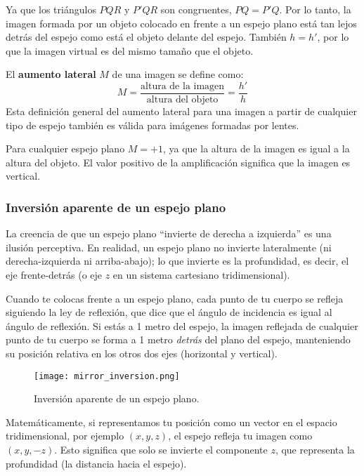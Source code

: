 Ya que los triángulos \(PQR\) y \(P'QR\) son congruentes, \(PQ=P'Q\). Por lo tanto, la imagen formada por un objeto colocado en frente a un espejo plano está tan lejos detrás del espejo como está el objeto delante del espejo. También \(h=h'\), por lo que la imagen virtual es del mismo tamaño que el objeto.

El \textbf{aumento lateral} \(M\) de una imagen se define como:
\begin{equation}
M = \frac{\text{altura de la imagen}}{\text{altura del objeto}} = \frac{h'}{h}
\label{eq:aumento_lateral}
\end{equation}
Esta definición general del aumento lateral para una imagen a partir de cualquier tipo de espejo también es válida para imágenes formadas por lentes.

Para cualquier espejo plano \(M=+1\), ya que la altura de la imagen es igual a la altura del objeto. El valor positivo de la amplificación significa que la imagen es vertical.

\subsubsection{Inversión aparente de un espejo plano}

La creencia de que un espejo plano ``invierte de derecha a izquierda'' es una ilusión perceptiva. En realidad, un espejo plano no invierte lateralmente (ni derecha-izquierda ni arriba-abajo); lo que invierte es la profundidad, es decir, el eje frente-detrás (o eje \(z\) en un sistema cartesiano tridimensional).

Cuando te colocas frente a un espejo plano, cada punto de tu cuerpo se refleja siguiendo la ley de reflexión, que dice que el ángulo de incidencia es igual al ángulo de reflexión. Si estás a 1 metro del espejo, la imagen reflejada de cualquier punto de tu cuerpo se forma a 1 metro \textit{detrás} del plano del espejo, manteniendo su posición relativa en los otros dos ejes (horizontal y vertical).

\begin{wrapfigure}{l}{0.43\textwidth}
  \centering
  \texttt{[image: mirror\_inversion.png]}
  \caption{Inversión aparente de un espejo plano.}
  \label{fig:mirror_inversion}
\end{wrapfigure}
Matemáticamente, si representamos tu posición como un vector en el espacio tridimensional, por ejemplo \((x,y,z)\), el espejo refleja tu imagen como \((x,y,-z)\). Esto significa que solo se invierte el componente \(z\), que representa la profundidad (la distancia hacia el espejo).

